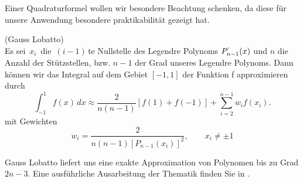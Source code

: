 Einer Quadraturformel wollen wir besondere Beachtung schenken, da diese für unsere Anwendung besondere praktikabilität gezeigt hat. 

\begin{Definition} (Gauss Lobatto) \\
Es sei $\, x_i \, $ die $\, (i-1) \,$te Nullstelle des Legendre Polynoms $P^{`}_{n-1}(x)$ und $n$ die Anzahl der Stützstellen, bzw. $n-1$ der Grad unseres Legendre Polynoms. Dann können wir das Integral auf dem Gebiet $[-1,1]$ der Funktion f approximieren durch
\begin{equation*}
\int _{-1}^{1}{f(x)\,dx} \approx {\frac {2}{n(n-1)}}[f(1)+f(-1)]+\sum _{i=2}^{n-1}{w_{i}f(x_{i})}.
\end{equation*}
mit Gewichten
\begin{equation*}
w_{i}={\frac {2}{n(n-1)[P_{n-1}(x_{i})]^{2}}},\qquad x_{i}\neq \pm 1
\end{equation*}
\end{Definition}

Gauss Lobatto liefert uns eine exakte Approximation von Polynomen bis zu Grad $2n-3$. Eine ausführliche  Ausarbeitung der Thematik finden Sie in \cite[79]{Rannacher}.





